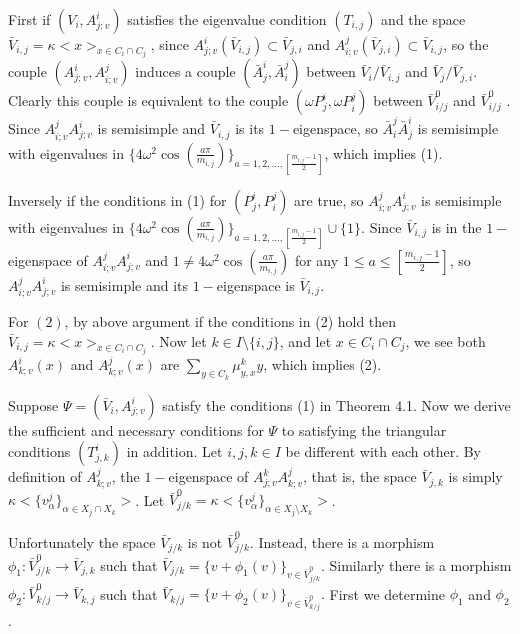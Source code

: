 \def\CTEXPreproc{Created by ctex v0.2.12, don't edit!}\documentclass[11pt]{article}
\begin{document}
\begin{pf} First if $( V_i , A^i _{j;v} )$ satisfies the eigenvalue condition $(T_{i,j})$ and the space $\bar{V}_{i,j} = \kappa < x >_{x\in C_i \cap C_j }$, since $A^i _{j;v} ( \bar{V}_{i,j} ) \subset \bar{V}_{j,i}$ and $A^j _{i;v} ( \bar{V}_{j,i} ) \subset \bar{V}_{i,j}$, so the couple $( A^i _{j;v} , A^j _{i;v}  )$ induces
 a couple $ ( \bar{A}^i _j , \bar{A}^j _i   ) $ between $\bar{V}_i / \bar{V}_{i,j}   $ and $ \bar{V}_j / \bar{V}_{j,i}  $.  Clearly this couple is equivalent to the couple $( \omega P^i _j , \omega P^j _i  ) $ between $\bar{V}^0 _{i/j} $ and $\bar{V}^0 _{i/j} $ .  Since $A^j _{i;v} A^i _{j;v}$ is semisimple and $\bar{V}_{i,j}$ is its $1-$eigenspace,
 so $\bar{A}^j _i \bar{A}^i _j $ is semisimple with eigenvalues in $\{ 4\omega^2 \cos ( \frac{a\pi}{m_{i,j} } ) \} _{a=1,2,...,[\frac{m_{i,j}-1}{2}]   } $, which implies (1).

Inversely if the conditions in (1) for  $( P^i _j , P^j _i )$ are true,  so $A^j _{i;v} A^i _{j;v}   $ is semisimple with eigenvalues in $\{ 4\omega^2 \cos ( \frac{a\pi}{m_{i,j} } ) \} _{a=1,2,...,[\frac{m_{i,j}-1}{2}]   } \cup \{ 1\} $. Since $\bar{V}_{i,j}$ is in the $1-$eigenspace of
  $A^j _{i;v} A^i _{j;v}$ and $1\neq 4\omega^2 \cos ( \frac{a\pi}{m_{i,j} } )$   for any $1\leq a\leq [\frac{m_{i,j}-1}{2}]$, so $ A^j _{i;v} A^i _{j;v}$ is semisimple and its $1-$eigenspace is  $\bar{V}_{i,j}$.



For $(2)$, by above argument if the conditions in (2) hold then $\bar{V}_{i,j}=\kappa <x>_{x\in C_i \cap C_j }$. Now let $k\in I\setminus \{i,j \} $, and let $x\in C_i \cap C_j $, we see both $A^i _{k;v} (x)$ and $A^j _{k;v} (x)$ are $ \sum_{y\in C_k} \mu^k _{y,x} y $, which implies (2).\\


\end{pf}

Suppose  $\Psi=( \bar{V}_i , A^i _{j;v}  )$ satisfy the conditions (1) in Theorem 4.1.  Now we derive the sufficient and necessary conditions for $\Psi $ to satisfying the triangular conditions $(T^i _{j,k})$ in addition. Let $i,j,k\in I$ be different with each other. By definition of $A^j _{k;v} $, the $1-$eigenspace of $A^k _{j;v} A^j _{k;v}$, that is, the space $\bar{V}_{j,k}$ is simply
$\kappa <  \{ v^j _{\alpha} \}_{\alpha\in X_j \cap X_k }   >  $.  Let $\bar{V}^0 _{j/k}=\kappa < \{ v^{j} _{\alpha}  \}_{\alpha \in X_j \setminus X_k }   >$.

Unfortunately the space $\bar{V}_{j/k}$ is not $ \bar{V}^0 _{j/k}$. Instead, there is a morphism
$\phi_1 : \bar{V}^0 _{j/k} \rightarrow  \bar{V}_{j,k} $ such that $\bar{V}_{j/k}= \{  v+\phi_1 (v)       \}_{v \in \bar{V}^0 _{j/k}}  . $ Similarly there is a morphism
$\phi_2 : \bar{V}^0 _{k/j} \rightarrow \bar{V}_{k,j} $ such that $\bar{V}_{k/j}= \{  v+\phi_2 (v)       \}_{v \in \bar{V}^0 _{k/j}}  . $ First we determine $\phi_1$ and $\phi_2$.
\end{document}
